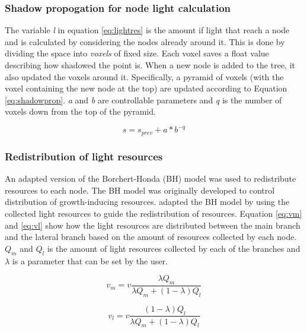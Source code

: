 \documentclass{article}
\begin{document}
  			\subsubsection*{Shadow propogation for node light calculation}
  				
  				The variable \textit{l} in equation \ref{eq:lightres} is the amount if light that reach a node and is calculated by considering the nodes already around it. This is done by dividing the space into \textit{voxels} of fixed size. Each voxel saves a float value describing how shadowed the point is. When a new node is added to the tree, it also updated the voxels around it. Specifically, a pyramid of voxels (with the voxel containing the new node at the top) are updated according to Equation \ref{eq:shadowprop}. \textit{a} and \textit{b} are controllable parameters and \textit{q} is the number of voxels down from the top of the pyramid. \citep{palubicki2009self}
  				
  				\begin{equation}
  					\label{eq:shadowprop}
  					s = s_{prev} + a*b^{-q}
  				\end{equation}
  			
  			\subsubsection*{Redistribution of light resources}
  				An adapted version of the Borchert-Honda (BH) model \citep{borchert1984control} was used to redistribute resources to each node. The BH model was originally developed to control distribution of growth-inducing resources. \cite{palubicki2009self} adapted the BH model by using the collected light resources to guide the redistribution of resources. Equation \ref{eq:vm} and \ref{eq:vl} show how the light resources are distributed between the main branch and the lateral branch  based on the amount of resources collected by each node. $Q_m$ and $Q_l$ is the amount of light resources collected by each of the branches and $\lambda$ is a parameter that can be set by the user.
  			
	  			\begin{equation}
	  				\label{eq:vm}
	  				v_m = v\frac{\lambda Q_m}{\lambda Q_m + (1 - \lambda)Q_l}
	  			\end{equation}
	  			
	  			\begin{equation}
	  				\label{eq:vl}
	  				v_l = v\frac{(1 - \lambda) Q_l}{\lambda Q_m + (1 - \lambda)Q_l}
	  			\end{equation}
	  			
\end{document}
